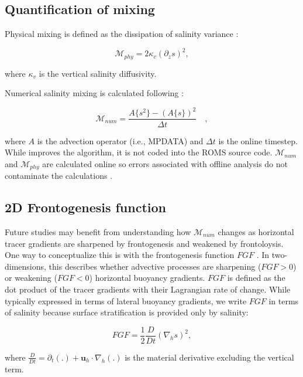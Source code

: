 \documentclass[draft]{agujournal2019}
\begin{document}
\subsection{Quantification of mixing}
Physical mixing is defined as the dissipation of salinity variance \cite{Burchard_2008, MacCready_2018}:
\begin{linenomath*}
    \begin{equation}
        \mathcal{M}_{phy} = 2 \kappa_v \left(\partial_z s \right)^2, 
    \end{equation}
\end{linenomath*}
where $\kappa_v$ is the vertical salinity diffusivity. 

Numerical salinity mixing is calculated following :
\begin{linenomath*}
    \begin{equation} \label{eq:mnum}
        \mathcal{M}_{num} = \frac{A\{ s^2 \}-\left(A \{s \} \right)^2}{\Delta t} \quad ,
    \end{equation}
\end{linenomath*}
where $A$ is the advection operator (i.e., MPDATA) and $\Delta t$ is the online timestep. While  improves the  algorithm, it is not coded into the ROMS source code. $\mathcal{M}_{num}$ and $\mathcal{M}_{phy}$ are calculated online so errors associated with offline analysis do not contaminate the calculations \cite{Schlichting23}.

\subsection{2D Frontogenesis function}
Future studies may benefit from understanding how $\mathcal{M}_{num}$ changes as horizontal tracer gradients are sharpened by frontogenesis and weakened by frontoloysis. One way to conceptualize this is with the frontogenesis function $FGF$ \cite{hoskins1982mathematical, mcwilliams2021oceanic}. In two-dimensions, this describes whether advective processes are sharpening ($FGF>0$) or weakening ($FGF<0$) horizontal buoyancy gradients. $FGF$ is defined as the dot product of the tracer gradients with their Lagrangian rate of change. While typically expressed in terms of lateral buoyancy gradients, we write $FGF$ in terms of salinity because surface stratification is provided only by salinity:
\begin{linenomath*}
    \begin{equation} \label{eqn:fgf_2d}
        FGF = \frac{1}{2}\frac{D}{Dt} \left(\nabla_h s \right)^2,
    \end{equation}
\end{linenomath*}
where $\frac{D}{Dt} = \partial_t(.) + \mathbf{u}_h \cdot \nabla_h (.)$ is the material derivative excluding the vertical term. 
\end{document}
